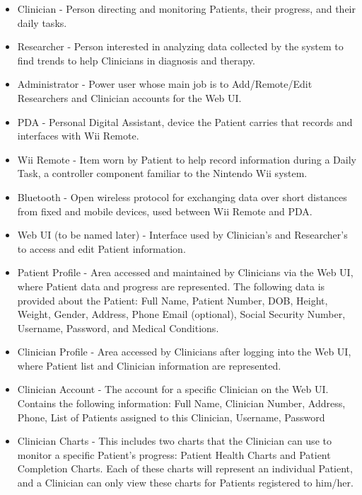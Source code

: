 \documentclass{article}
\begin{document}
\begin{itemize}
\item Clinician - Person directing and monitoring Patients, their progress, and their daily tasks.

\item Researcher - Person interested in analyzing data collected by the system to find trends to help Clinicians in diagnosis and therapy.

\item Administrator - Power user whose main job is to Add/Remote/Edit Researchers and Clinician accounts for the Web UI.

\item PDA - Personal Digital Assistant, device the Patient carries that records and interfaces with Wii Remote.

\item Wii Remote - Item worn by Patient to help record information during a Daily Task, a controller component familiar to the Nintendo Wii system.

\item Bluetooth - Open wireless protocol for exchanging data over short distances from fixed and mobile devices, used between Wii Remote and PDA.

\item Web UI (to be named later) - Interface used by Clinician's and Researcher's to access and edit Patient information.

\item Patient Profile - Area accessed and maintained by Clinicians via the Web UI, where Patient data and progress are represented.
			The following data is provided about the Patient: Full Name, Patient Number, DOB, Height, Weight, Gender, Address, Phone
			Email (optional), Social Security Number, Username, Password, and Medical Conditions. 

\item Clinician Profile - Area accessed by Clinicians after logging into the Web UI, where Patient list and Clinician information are represented.

\item Clinician Account - The account for a specific Clinician on the Web UI. Contains the following information: Full Name, Clinician Number, Address, Phone, List of Patients assigned to this Clinician, Username, Password

\item Clinician Charts - This includes two charts that the Clinician can use to monitor a specific Patient's progress: Patient Health Charts and Patient Completion Charts. Each of these charts will represent an individual Patient, and a Clinician can only view these charts for Patients registered to him/her.


\end{itemize}
\end{document}
